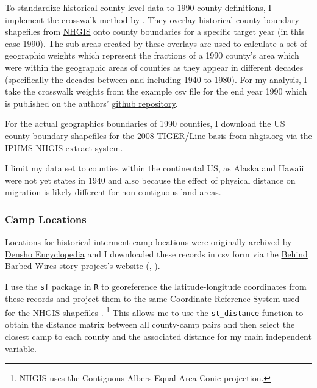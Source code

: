 \documentclass[12pt]{article}
\begin{document}
To standardize historical county-level data to 1990 county definitions, I implement the crosswalk
method by \cite{eckert_method_2020}. They overlay historical
county boundary shapefiles from \href{https://www.nhgis.org/}{NHGIS}
onto county boundaries for a specific target year (in this case 1990).
The sub-areas created by these overlays are used to calculate a set of
geographic weights which represent the fractions of a 1990 county's area
which were within the geographic areas of counties as they appear in
different decades (specifically the decades between and including 1940
to 1980). For my analysis, I take the crosswalk weights from the example
csv file for the end year 1990 which is published on the authors'
\href{https://github.com/liang-jack-a/EGLP_Crosswalk/tree/master}{github
repository}.

For the actual geographics boundaries of 1990 counties, I download the US county boundary shapefiles for the \href{https://www.census.gov/geographies/mapping-files/time-series/geo/tiger-line-file.html}{2008 TIGER/Line} basis from \url{nhgis.org} via the IPUMS NHGIS extract system.

I limit my data set to counties within the continental US, as Alaska and Hawaii were not yet states in 1940 and also because the effect of physical distance on migration is likely different for non-contiguous land areas.


\subsubsection{Camp Locations}\label{camp-locations}

Locations for historical interment camp locations were originally archived by
\href{http://encyclopedia.densho.org/War_Relocation_Authority/\#Planning_the_Camps}{Densho
Encyclopedia} and I downloaded these records in csv form via the
\href{https://www.arcgis.com/home/item.html?id=69183af8d45d4f46a9dc4eba99440891}{Behind
Barbed Wires} story project's website
(\cite{chrkan_behind_2019}, \cite{robinson_war_2023}).

I use the \texttt{sf} package in \texttt{R} to georeference the latitude-longitude coordinates from these records and project them to the same Coordinate Reference System used for the NHGIS shapefiles \citep{pebesma_simple_2018}.
\footnote{NHGIS uses the Contiguous Albers Equal Area Conic projection.}
This allows me to use the \texttt{st\_distance} function to obtain the distance matrix between all county-camp pairs and then select the closest camp to each county and the associated distance for my main independent variable.
\end{document}

